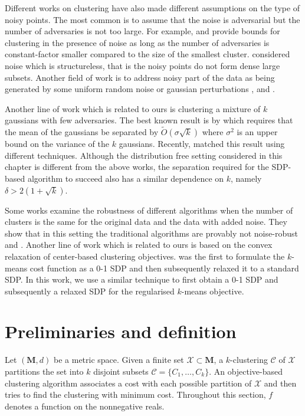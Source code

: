 \documentclass[12pt]{article}
\newcommand{\mc}{\mathcal}
\newcommand{\mb}{\mathbf}
\begin{document}
Different works on clustering have also made different assumptions on the type of noisy points. The most common is to assume that the noise is adversarial but the number of adversaries is not too large. For example, \cite{balcan2012clustering} and \cite{balcan2008discriminative} provide bounds for clustering in the presence of noise as long as the number of adversaries is constant-factor smaller compared to the size of the smallest cluster. \cite{kushagra2016finding} considered noise which is structureless, that is the noisy points do not form dense large subsets. Another field of work is to address noisy part of the data as being generated by some uniform random noise or gaussian perturbations \cite{cuesta1997trimmed}, \cite{garcia2008general} and \cite{dave1993robust}.  

Another line of work which is related to ours is clustering a mixture of $k$ gaussians with few adversaries. The best known result is by \cite{awasthi2012improved} which requires that the mean of the gaussians be separated by $\tilde O(\sigma \sqrt{k})$ where $\sigma^2$ is an upper bound on the variance of the $k$ gaussians. Recently, \cite{charikar2017learning} matched this result using different techniques. Although the distribution free setting considered in this chapter is different from the above works, the separation required for the SDP-based algorithm to succeed also has a similar dependence on $k$, namely $\delta > 2(1 + \sqrt{k})$. 

Some works examine the robustness of different algorithms when the number of clusters is the same for the original data and the data with added noise. They show that in this setting the traditional algorithms are provably not noise-robust \cite{hennig2008dissolution} and \cite{ackerman2013clustering}. Another line of work which is related to ours is based on the convex relaxation of center-based clustering objectives. \cite{peng2007approximating} was the first to formulate the $k$-means cost function as a 0-1 SDP and then subsequently relaxed it to a standard SDP. In this work, we use a similar technique to first obtain a 0-1 SDP and subsequently a relaxed SDP for the regularised $k$-means objective. 

\section{Preliminaries and definition}
\label{sec:pre}

Let $(\mb M, d)$ be a metric space. Given a finite set $\mc X \subset \mb M$, a $k$-clustering $\mc C$ of $\mc X$ partitions the set into $k$ disjoint subsets $\mc C = \{C_1, \ldots, C_k\}$. An objective-based clustering algorithm associates a cost with each possible partition of $\mc X$ and then tries to find the clustering with minimum cost. Throughout this section, $f$ denotes a function on the nonnegative reals.
\end{document}
